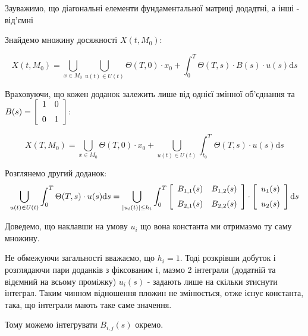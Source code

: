 \documentclass[fontsize=14pt,DIV=1,a4paper]{scrartcl}
\begin{document}
Зауважимо, що діагональні елементи фундаментальної матриці додадтні, а інші - від'ємні

Знайдемо множину досяжності $X(t, M_0)$:

\begin{equation}
X(t, M_0) = \bigcup_{x \in M_0} \bigcup_{u(t) \in U(t)} \Theta (T, 0)\cdot x_0 +\int_{0}^T \Theta (T, s) \cdot B(s)\cdot u(s) \mathrm{d}s
\end{equation}

Враховуючи, що кожен доданок залежить лише від однієї змінної об'єднання та $B(s)=\left[ \begin {array}{cc}
{1}&{0}\\ \noalign{\medskip}
{0}&{1}\end {array} \right]$:


\begin{equation}
X(T, M_0) = \bigcup_{x \in M_0} \Theta (T, 0)\cdot x_0 + \bigcup_{u(t) \in U(t)} \int_{t_0}^T \Theta (T, s) \cdot u(s) \mathrm{d}s
\end{equation}

Розглянемо другий доданок: 
\begin{equation}
	\bigcup_{u(t) \in U(t)} \int_{0}^T \Theta (T, s) \cdot u(s) \mathrm{d}s = 
	\bigcup_{|u_i(t)| \leq h_i} \int_{0}^T \left[ \begin {array}{cc}
	{B_{1,1}(s)}&{B_{1,2}(s)}\\ \noalign{\medskip}
	{B_{2,1}(s)}&{B_{2,2}(s)}\end {array} \right]\cdot \left[ \begin {array}{cc}
	{u_{1}(s)}\\ \noalign{\medskip}
	{u_{2}(s)}\end {array} \right] \mathrm{d}s
\end{equation}

Доведемо, що наклавши на умову $u_{i}$ що вона константа ми отримаэмо ту саму множину.

Не обмежуючи загальності вважаємо, що $h_i=1$. Тоді розкрівши добуток і розглядаючи пари доданків з фіксованим i, маэмо 2 інтеграли (додатній та відємний на всьому проміжку) $u_i(s)$ - задають лише на скільки зтиснути інтеграл. Таким чинном відношення пложин не змінюється, отже існує константа, така, що інтеграли мають таке саме значення.

Тому можемо інтегрувати $B_{i,j}(s)$ окремо.
\end{document}
